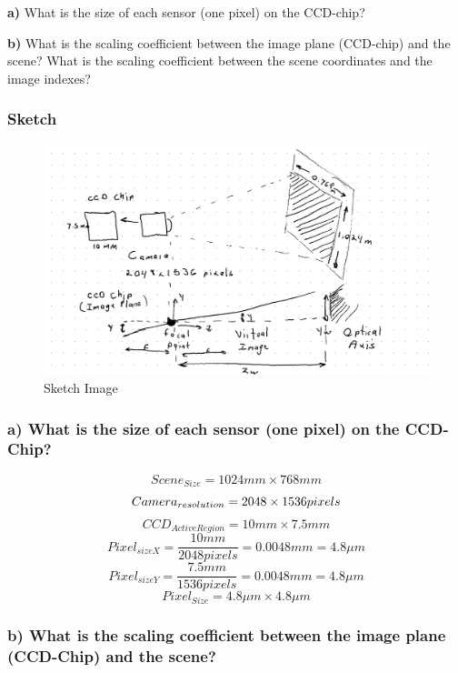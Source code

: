 \documentclass[border=1in]{standalone}
\begin{document}
\begin{minipage}{21cm}
\textbf{a)} What is the size of each sensor (one pixel) on the CCD-chip?

\textbf{b)} What is the scaling coefficient between the image plane
(CCD-chip) and the scene? What is the scaling coefficient between the
scene coordinates and the image indexes?

    \hypertarget{sketch}{%
\subsubsection{Sketch}\label{sketch}}

\begin{figure}
\centering
\includegraphics{./images/sketch.png}
\caption{Sketch Image}
\end{figure}

    \hypertarget{a-what-is-the-size-of-each-sensor-one-pixel-on-the-ccd-chip}{%
\subsubsection{a) What is the size of each sensor (one pixel) on the
CCD-Chip?}\label{a-what-is-the-size-of-each-sensor-one-pixel-on-the-ccd-chip}}

\[Scene_{Size}=1024mm \times 768mm\]
\[Camera_{resolution}=2048 \times 1536 \space pixels\]
\[CCD_{ActiveRegion}=10mm \times 7.5mm\]
\[Pixel_{sizeX}=\frac{10mm}{2048pixels}=0.0048mm=4.8 \mu m\]
\[Pixel_{sizeY}=\frac{7.5mm}{1536pixels}=0.0048mm=4.8 \mu m\]
\[Pixel_{Size}=4.8 \mu m \times 4.8 \mu m \]

    \hypertarget{b-what-is-the-scaling-coefficient-between-the-image-plane-ccd-chip-and-the-scene}{%
\subsubsection{b) What is the scaling coefficient between the image
plane (CCD-Chip) and the
scene?}\label{b-what-is-the-scaling-coefficient-between-the-image-plane-ccd-chip-and-the-scene}}


\end{minipage}
\end{document}
